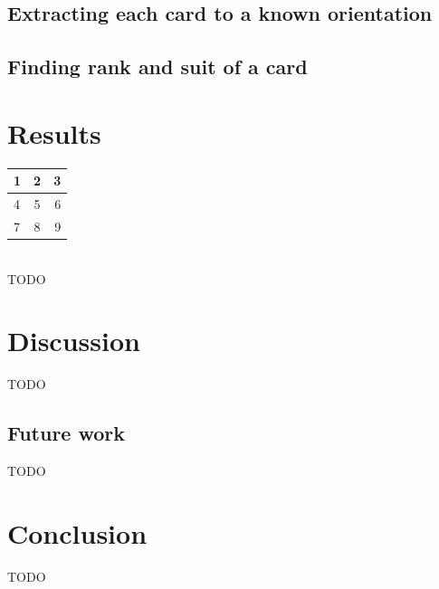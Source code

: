 \documentclass[journal,twoside]{IEEEtran}
\begin{document}
\subsection{Extracting each card to a known orientation}

\subsection{Finding rank and suit of a card}

\section{Results}

\begin{tabular}{|  l | c | r | }
  \hline                       
  1 & 2 & 3 \\ \hline
  4 & 5 & 6 \\ \hline
  7 & 8 & 9 \\
  \hline  
\end{tabular} \\

TODO


\section{Discussion}

TODO


\subsection{Future work}

TODO


\section{Conclusion}

TODO
\end{document}
